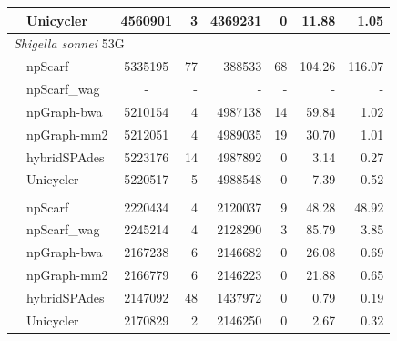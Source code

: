\documentclass[10pt,twocolumn,twoside]{genpaper}
\begin{document}
\begin{longtable}[!hpt]{llcrrrrr}
\rowcolor{Gray}
& Unicycler & 4560901  & 3   &  4369231  &  0  & 11.88  & 1.05 \\
\hline
\multicolumn{8}{l}{\emph{Shigella sonnei} 53G} \\* %
\nobreakmidrule
& npScarf &  5335195 &  77  &  388533  &  68  & 104.26  &  116.07\\*
& npScarf\_wag & -  &  -  &  -  &  -  & -  &  -\\*
& npGraph-bwa & 5210154  &   4 &  4987138  & 14  & 59.84  &  1.02\\*
& npGraph-mm2 & 5212051  &  4  &   4989035 & 19  &  30.70 &  1.01\\*
& hybridSPAdes & 5223176  &  14  &  4987892  &  0  & 3.14  & 0.27\\*
& Unicycler &  5220517 &  5 &  4988548 & 0  & 7.39  &  0.52\\
\hline
\rowcolor{Gray}
\multicolumn{8}{l}{\emph{Streptococcus suis} BM407} \\* %
\nobreakmidrule
\rowcolor{Gray}
& npScarf &  2220434 & 4   &  2120037  &  9  & 48.28  & 48.92\\*
\rowcolor{Gray}
& npScarf\_wag & 2245214  &  4  &  2128290  &  3  & 85.79  & 3.85\\*
\rowcolor{Gray}
& npGraph-bwa & 2167238  &  6  &  2146682  &  0  & 26.08  & 0.69\\*
\rowcolor{Gray}
& npGraph-mm2 & 2166779  &  6  &  2146223  &  0  & 21.88  & 0.65\\*
\rowcolor{Gray}
& hybridSPAdes & 2147092  &  48  &  1437972  &  0  & 0.79  &  0.19\\*
\rowcolor{Gray}
& Unicycler &  2170829 &   2 &  2146250  &  0  &  2.67 & 0.32 \\
\hline
\end{longtable}
\end{document}
